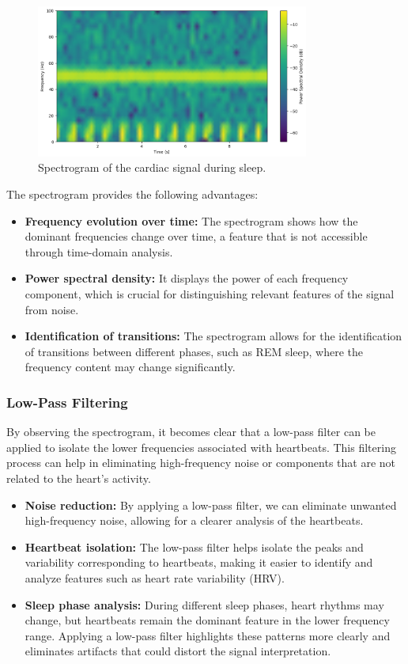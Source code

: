 \documentclass[10pt]{article}
\theoremstyle{definition}
\theoremstyle{remark}
\theoremstyle{definition}
\numberwithin{equation}{prob}
\begin{document}
\begin{figure}[H]
    \centering
    \includegraphics[width=0.8\textwidth]{./figures/Spectogram Sleep.png}
    \caption{Spectrogram of the cardiac signal during sleep.}
    \label{fig:spectrogram_sleep}
\end{figure}

The spectrogram provides the following advantages:

\begin{itemize}
    \item \textbf{Frequency evolution over time:} The spectrogram shows how the dominant frequencies change over time, a feature that is not accessible through time-domain analysis.
    \item \textbf{Power spectral density:} It displays the power of each frequency component, which is crucial for distinguishing relevant features of the signal from noise.
    \item \textbf{Identification of transitions:} The spectrogram allows for the identification of transitions between different phases, such as REM sleep, where the frequency content may change significantly.
\end{itemize}

\subsubsection{Low-Pass Filtering}

By observing the spectrogram, it becomes clear that a low-pass filter can be applied to isolate the lower frequencies associated with heartbeats. This filtering process can help in eliminating high-frequency noise or components that are not related to the heart's activity.

\begin{itemize}
    \item \textbf{Noise reduction:} By applying a low-pass filter, we can eliminate unwanted high-frequency noise, allowing for a clearer analysis of the heartbeats.
    \item \textbf{Heartbeat isolation:} The low-pass filter helps isolate the peaks and variability corresponding to heartbeats, making it easier to identify and analyze features such as heart rate variability (HRV).
    \item \textbf{Sleep phase analysis:} During different sleep phases, heart rhythms may change, but heartbeats remain the dominant feature in the lower frequency range. Applying a low-pass filter highlights these patterns more clearly and eliminates artifacts that could distort the signal interpretation.
\end{itemize}
\end{document}
